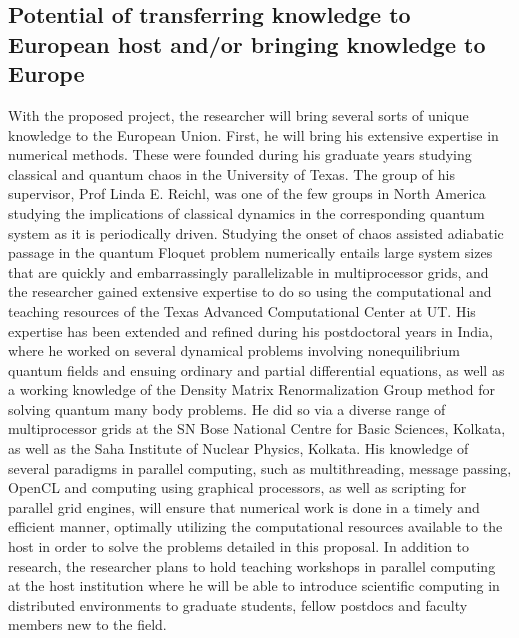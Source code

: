 \documentclass[a4paper,11pt,color]{article}
\begin{document}
\subsection{Potential of transferring knowledge to European host and/or bringing knowledge to Europe}
\label{sec:training_relevance}
With the proposed project, the researcher will bring several sorts of unique knowledge to the European Union. First, he will bring his extensive expertise in numerical methods. These were founded during his graduate years studying classical and quantum chaos in the University of Texas. The group of his supervisor, Prof Linda E. Reichl, was one of the few groups in North America studying the implications of classical dynamics in the corresponding quantum system as it is periodically driven. Studying the onset of chaos assisted adiabatic passage in the quantum Floquet problem numerically entails large system sizes that are quickly and embarrassingly parallelizable in multiprocessor grids, and the researcher gained extensive expertise to do so using the computational and teaching resources of the Texas Advanced Computational Center at UT. His expertise has been extended and refined during his postdoctoral years in India, where he worked on several dynamical problems involving nonequilibrium quantum fields and 
ensuing ordinary and partial differential equations, as well as a working knowledge of the Density Matrix Renormalization Group method for solving quantum many body problems. He did so via a diverse range of multiprocessor grids at the SN Bose National Centre for Basic Sciences, Kolkata, as well as the Saha Institute of Nuclear Physics, Kolkata. His knowledge of several paradigms in parallel computing, such as multithreading, message passing, OpenCL and computing using graphical processors, as well as scripting for parallel grid engines, will ensure that numerical work is done in a timely and efficient manner, optimally utilizing the computational resources available to the host in order to solve the problems detailed in this proposal. In addition to research, the researcher plans to hold teaching workshops in parallel computing at the host institution where he will be able to introduce scientific computing in distributed environments to graduate students, fellow postdocs and faculty members new to the field.
\end{document}
